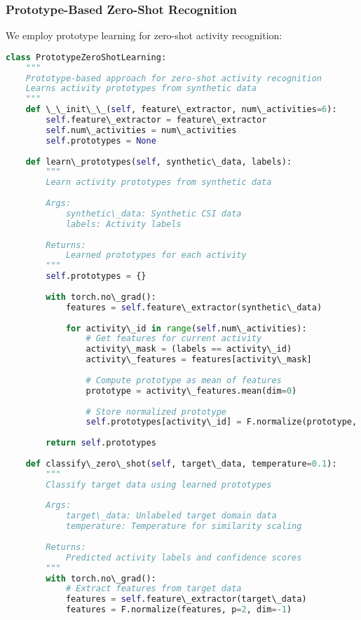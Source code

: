 \documentclass[journal]{IEEEtran}
\begin{document}
\subsubsection{Prototype-Based Zero-Shot Recognition}

We employ prototype learning for zero-shot activity recognition:

\begin{lstlisting}[language=Python, caption=Prototype-Based Zero-Shot Learning]
class PrototypeZeroShotLearning:
    """
    Prototype-based approach for zero-shot activity recognition
    Learns activity prototypes from synthetic data
    """
    def \_\_init\_\_(self, feature\_extractor, num\_activities=6):
        self.feature\_extractor = feature\_extractor
        self.num\_activities = num\_activities
        self.prototypes = None
        
    def learn\_prototypes(self, synthetic\_data, labels):
        """
        Learn activity prototypes from synthetic data
        
        Args:
            synthetic\_data: Synthetic CSI data
            labels: Activity labels
        
        Returns:
            Learned prototypes for each activity
        """
        self.prototypes = {}
        
        with torch.no\_grad():
            features = self.feature\_extractor(synthetic\_data)
            
            for activity\_id in range(self.num\_activities):
                # Get features for current activity
                activity\_mask = (labels == activity\_id)
                activity\_features = features[activity\_mask]
                
                # Compute prototype as mean of features
                prototype = activity\_features.mean(dim=0)
                
                # Store normalized prototype
                self.prototypes[activity\_id] = F.normalize(prototype, p=2, dim=-1)
        
        return self.prototypes
    
    def classify\_zero\_shot(self, target\_data, temperature=0.1):
        """
        Classify target data using learned prototypes
        
        Args:
            target\_data: Unlabeled target domain data
            temperature: Temperature for similarity scaling
        
        Returns:
            Predicted activity labels and confidence scores
        """
        with torch.no\_grad():
            # Extract features from target data
            features = self.feature\_extractor(target\_data)
            features = F.normalize(features, p=2, dim=-1)
            

\end{lstlisting}
\end{document}
